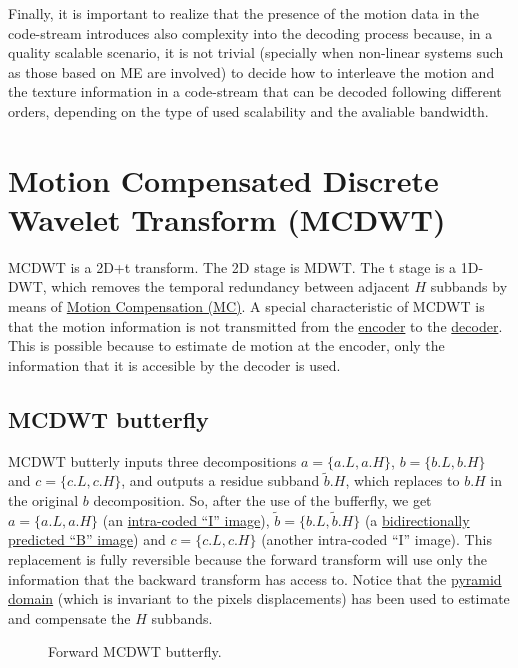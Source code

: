 Finally, it is important to realize that the presence of the motion
data in the code-stream introduces also complexity into the decoding
process because, in a quality scalable scenario, it is not trivial
(specially when non-linear systems such as those based on ME are
involved) to decide how to interleave the motion and the texture
information in a code-stream that can be decoded following different
orders, depending on the type of used scalability and the avaliable
bandwidth.

\section{Motion Compensated Discrete Wavelet Transform (MCDWT)}
MCDWT is a 2D+t transform. The 2D stage is MDWT. The t stage is a
1D-DWT, which removes the temporal redundancy between adjacent $H$
subbands by means of
\href{https://en.wikipedia.org/wiki/Motion_compensation}{Motion
  Compensation (MC)}. A special characteristic of MCDWT is that the
motion information is not transmitted from the
\href{https://en.wikipedia.org/wiki/Encoder}{encoder} to the
\href{https://en.wikipedia.org/wiki/Decoder}{decoder}. This is
possible because to estimate de motion at the encoder, only the
information that it is accesible by the decoder is used.

\subsection{MCDWT butterfly}

MCDWT butterly inputs three decompositions $a=\{a.L, a.H\}$, $b=\{b.L,
b.H\}$ and $c=\{c.L, c.H\}$, and outputs a residue subband
$\tilde{b}.H$, which replaces to $b.H$ in the original $b$
decomposition. So, after the use of the bufferfly, we get $a=\{a.L,
a.H\}$ (an
\href{https://en.wikipedia.org/wiki/Video_compression_picture_types}{intra-coded
  ``I'' image}), $\tilde{b}=\{b.L, \tilde{b}.H\}$ (a
\href{https://en.wikipedia.org/wiki/Video_compression_picture_types}{bidirectionally
  predicted ``B'' image}) and $c=\{c.L, c.H\}$ (another intra-coded
``I'' image). This replacement is fully reversible because the forward
transform will use only the information that the backward transform
has access to. Notice that the
\href{http://www.vtvt.ece.vt.edu/research/references/video/DCT_Video_Compression/Zhang92a.pdf}{pyramid
  domain} (which is invariant to the pixels displacements) has been
used to estimate and compensate the $H$ subbands.

\begin{figure}
\centering
{}
\caption{Forward MCDWT butterfly.}
\end{figure}


